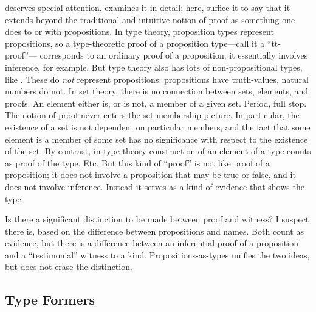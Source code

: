  deserves special
attention.   examines it in detail; here, suffice it
to say that it extends beyond the traditional and intuitive notion of
proof as something one does to or with propositions.  In type theory,
proposition types represent propositions, so a type-theoretic proof
of a proposition type---call it a ``tt-proof''--- corresponds to an
ordinary proof of a proposition; it essentially involves inference,
for example.  But type theory also has lots of non-propositional
types, like \N.  These do \textit{not} represent propositions:
propositions have truth-values, natural numbers do not.  In set
theory, there is no connection between sets, elements, and proofs.  An
element either is, or is not, a member of a given set.  Period, full
stop.  The notion of proof never enters the set-membership
picture.
In particular, the existence of a set is not dependent on particular
members, and the fact that some element is a member of some set has no
significance with respect to the existence of the set.  By contrast,
in type theory construction of an element of a type counts as proof of
the type.  Etc.  But this kind of
``proof'' is not like proof of a proposition; it does not involve a
proposition that may be true or false, and it does not involve
inference.  Instead it serves as a kind of evidence that shows the
type.

\begin{ednote}
  Is there a significant distinction to be made between proof and
  witness?  I suspect there is, based on the difference between
  propositions and names.  Both count as evidence, but there is a
  difference between an inferential proof of a proposition and a
  ``testimonial'' witness to a kind.  Propositions-as-types unifies
  the two ideas, but does not erase the distinction.
\end{ednote}

\subsection{Type Formers}
\label{subs:hottrules}

